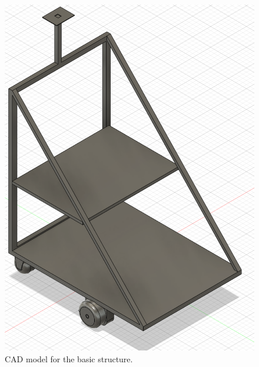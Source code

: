 \begin{figure}[h]
  \centering
  \begin{minipage}[b]{0.35\textwidth}
    \includegraphics[width=\textwidth]{images/frame/frame2.PNG}
    \caption{CAD model for the basic structure.}
  \end{minipage}
  \hfill
  \begin{minipage}[b]{0.4\textwidth}

\end{minipage}
\end{figure}
